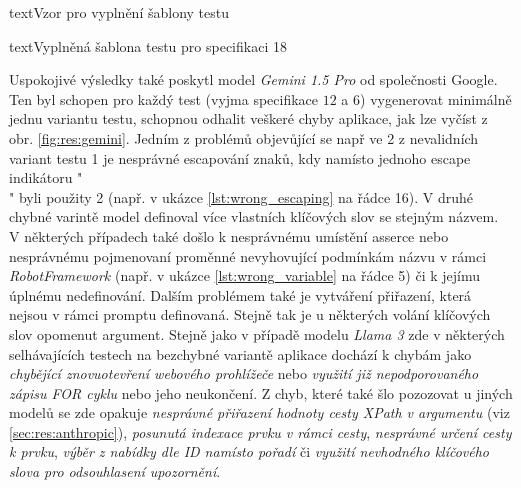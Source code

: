 \documentclass[czech, ma, kiv, he, iso690numb, pdf, viewonly]{fasthesis}
\begin{document}
\begin{code}{text}{Vzor pro vyplnění šablony testu \label{lst:template}}
{\begin{code}{text}{Vyplněná šablona testu pro specifikaci 18 \label{lst:spec18}}
{            Uspokojivé výsledky také poskytl model \textit{Gemini 1.5 Pro} od společnosti Google. Ten byl schopen pro každý test (vyjma specifikace \(12\) a \(6\)) vygenerovat minimálně jednu variantu testu, schopnou odhalit veškeré chyby aplikace, jak lze vyčíst z obr. \ref{fig:res:gemini}. Jedním z problémů objevůjící se např ve 2 z nevalidních variant testu 1 je nesprávné escapování znaků, kdy namísto jednoho escape indikátoru "\\" byli použity 2 (např. v ukázce \ref{lst:wrong_escaping} na řádce 16). V druhé chybné varintě model definoval více vlastních klíčových slov se stejným názvem. V některých případech také došlo k nesprávnému umístění asserce nebo nesprávnému pojmenovaní proměnné nevyhovující podmínkám názvu v rámci \textit{RobotFramework} (např. v ukázce \ref{lst:wrong_variable} na řádce 5) či k jejímu úplnému nedefinování. Dalším problémem také je vytváření přiřazení, která nejsou v rámci promptu definovaná. Stejně tak je u některých volání klíčových slov opomenut argument. Stejně jako v případě modelu \textit{Llama 3} zde v některých selhávajících testech na bezchybné variantě aplikace dochází k chybám jako \textit{chybějící znovuotevření webového prohlížeče} nebo \textit{využití již nepodporovaného zápisu FOR cyklu} nebo jeho neukončení. Z chyb, které také šlo pozozovat u jiných modelů se zde opakuje \textit{nesprávné přiřazení hodnoty cesty XPath v argumentu} (viz \ref{sec:res:anthropic}), \textit{posunutá indexace prvku v rámci cesty}, \textit{nesprávné určení cesty k prvku}, \textit{výběr z nabídky dle ID namísto pořadí} či \textit{využití nevhodného klíčového slova pro odsouhlasení upozornění}.

}
\end{code}}
\end{code}
\end{document}
